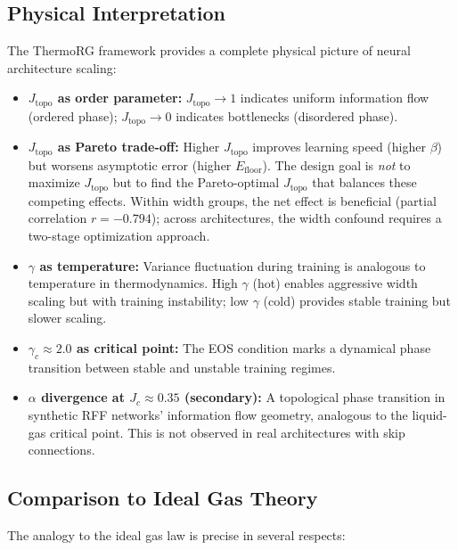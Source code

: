 \documentclass[11pt, a4paper]{article}
\theoremstyle{plain}
\begin{document}
\subsection{Physical Interpretation}

The ThermoRG framework provides a complete physical picture of neural architecture scaling:

\begin{itemize}
\item \textbf{$J_{\mathrm{topo}}$ as order parameter:} $J_{\mathrm{topo}} \to 1$ indicates uniform information flow (ordered phase); $J_{\mathrm{topo}} \to 0$ indicates bottlenecks (disordered phase).

\item \textbf{$J_{\mathrm{topo}}$ as Pareto trade-off:} Higher $J_{\mathrm{topo}}$ improves learning speed (higher $\beta$) but worsens asymptotic error (higher $E_{\mathrm{floor}}$). The design goal is \emph{not} to maximize $J_{\mathrm{topo}}$ but to find the Pareto-optimal $J_{\mathrm{topo}}$ that balances these competing effects. Within width groups, the net effect is beneficial (partial correlation $r = -0.794$); across architectures, the width confound requires a two-stage optimization approach.

\item \textbf{$\gamma$ as temperature:} Variance fluctuation during training is analogous to temperature in thermodynamics. High $\gamma$ (hot) enables aggressive width scaling but with training instability; low $\gamma$ (cold) provides stable training but slower scaling.

\item \textbf{$\gamma_c \approx 2.0$ as critical point:} The EOS condition marks a dynamical phase transition between stable and unstable training regimes.

\item \textbf{$\alpha$ divergence at $J_c \approx 0.35$ (secondary):} A topological phase transition in synthetic RFF networks' information flow geometry, analogous to the liquid-gas critical point. This is not observed in real architectures with skip connections.
\end{itemize}

\subsection{Comparison to Ideal Gas Theory}

The analogy to the ideal gas law is precise in several respects:
\end{document}
